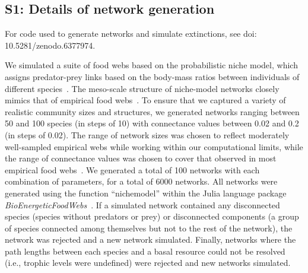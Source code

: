\documentclass[12pt]{article}
\begin{document}
\clearpage

\linenumbers
\begin{spacing}{2.0}

\section*{S1: Details of network generation}

    For code used to generate networks and simulate extinctions, see doi: 10.5281/zenodo.6377974.

	We simulated a suite of food webs based on the probabilistic niche model, which assigns predator-prey links based on the body-mass ratios between individuals of different species~\citep{Williams2000,Delmas2017}. The meso-scale structure of niche-model networks closely mimics that of empirical food webs~\citep{Stouffer2007}. To ensure that we captured a variety of realistic community sizes and structures, we generated networks ranging between 50 and 100 species (in steps of 10) with connectance values between 0.02 and 0.2 (in steps of 0.02). The range of network sizes was chosen to reflect moderately well-sampled empirical webs while working within our computational limits, while the range of connectance values was chosen to cover that observed in most empirical food webs~\citep{Dunne2002e}. We generated a total of 100 networks with each combination of parameters, for a total of 6000 networks. All networks were generated using the function ``nichemodel'' within the Julia language package \emph{BioEnergeticFoodWebs}~\citep{bioenergeticfw,Delmas2017}. If a simulated network contained any disconnected species (species without predators or prey) or disconnected components (a group of species connected among themselves but not to the rest of the network), the network was rejected and a new network simulated. Finally, networks where the path lengths between each species and a basal resource could not be resolved (i.e., trophic levels were undefined) were rejected and new networks simulated.



\end{spacing}
\end{document}
